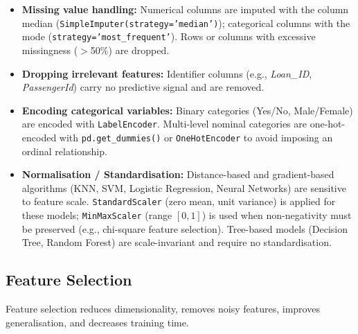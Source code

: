 \documentclass[12pt,a4paper]{article}
\begin{document}
\begin{itemize}[noitemsep]
  \item \textbf{Missing value handling:} Numerical columns are imputed with the column
        median (\texttt{SimpleImputer(strategy='median')}); categorical columns with the
        mode (\texttt{strategy='most\_frequent'}).
        Rows or columns with excessive missingness ($>$50\%) are dropped.
  \item \textbf{Dropping irrelevant features:} Identifier columns (e.g., \textit{Loan\_ID},
        \textit{PassengerId}) carry no predictive signal and are removed.
  \item \textbf{Encoding categorical variables:} Binary categories (Yes/No, Male/Female)
        are encoded with \texttt{LabelEncoder}. Multi-level nominal categories are
        one-hot-encoded with \texttt{pd.get\_dummies()} or \texttt{OneHotEncoder}
        to avoid imposing an ordinal relationship.
  \item \textbf{Normalisation / Standardisation:} Distance-based and gradient-based
        algorithms (KNN, SVM, Logistic Regression, Neural Networks) are sensitive to feature
        scale. \texttt{StandardScaler} (zero mean, unit variance) is applied for these models;
        \texttt{MinMaxScaler} (range $[0,1]$) is used when non-negativity must be preserved
        (e.g., chi-square feature selection).
        Tree-based models (Decision Tree, Random Forest) are scale-invariant and require no
        standardisation.
\end{itemize}

\subsection{Feature Selection}

Feature selection reduces dimensionality, removes noisy features, improves generalisation,
and decreases training time.
\end{document}
